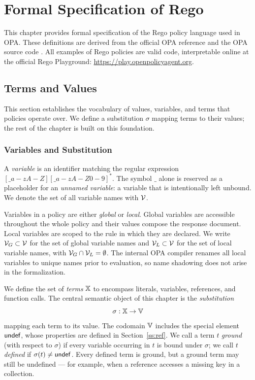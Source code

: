 \chapter{Formal Specification of Rego}
\label{ch:form}

This chapter provides formal specification of the Rego policy language used in OPA.
These definitions are derived from the official OPA reference \cite{opa:web} and the OPA source code \cite{opa:git}.
All examples of Rego policies are valid code, interpretable online at the official Rego Playground: \url{https://play.openpolicyagent.org}.

\section{Terms and Values}
\label{s:terms}


This section establishes the vocabulary of values, variables, and terms that \rego policies operate over.
We define a substitution $\sigma$ mapping terms to their values; the rest of the chapter is built on this foundation.


\subsection{Variables and Substitution}
\label{ss:vars}


A \emph{variable} is an identifier matching the regular expression $[\_a-zA-Z][\_a-zA-Z0-9]^*$.
The symbol $\_$ alone is reserved as a placeholder for an \emph{unnamed variable}: a variable that is intentionally left unbound.
We denote the set of all variable names with $\mathcal{V}$.

Variables in a \rego policy are either \emph{global} or \emph{local}.
Global variables are accessible throughout the whole policy and their values compose the response document.
Local variables are scoped to the rule in which they are declared.
We write $\mathcal{V}_G \subset \mathcal{V}$ for the set of global variable names and $\mathcal{V}_L \subset \mathcal{V}$ for the set of local variable names, with $\mathcal{V}_G \cap \mathcal{V}_L = \emptyset$.
The internal OPA compiler renames all local variables to unique names prior to evaluation, so name shadowing does not arise in the formalization.

We define the set of \rego \emph{terms} $\mathbb{X}$ to encompass literals, variables, references, and function calls.
The central semantic object of this chapter is the \emph{substitution}
$$\sigma : \mathbb{X} \to \mathbb{V}$$
mapping each term to its value.
The codomain $\mathbb{V}$ includes the special element $\mathsf{undef}$, whose properties are defined in Section~\ref{ss:ref}.
We call a term $t$ \emph{ground} (with respect to $\sigma$) if every variable occurring in $t$ is bound under $\sigma$; we call $t$ \emph{defined} if $\sigma(t) \neq \mathsf{undef}$.
Every defined term is ground, but a ground term may still be undefined — for example, when a reference accesses a missing key in a collection.

